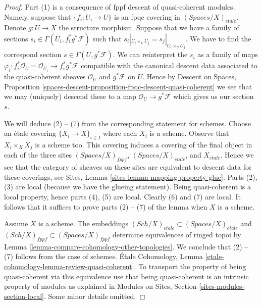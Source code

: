 \documentclass{stacks-project}
\theoremstyle{plain}
\theoremstyle{definition}
\theoremstyle{remark}
\numberwithin{equation}{subsection}
\def\Sch{\mathit{Sch}}
\def\etale{{\acute{e}tale}}
\begin{document}
\begin{proof}
Part (1) is a consequence of fppf descent of quasi-coherent modules.
Namely, suppose that $\{f_i : U_i \to U\}$ is an fpqc covering
in $(\textit{Spaces}/X)_\etale$. Denote $g : U \to X$ the structure
morphism. Suppose that
we have a family of sections $s_i \in \Gamma(U_i , f_i^*g^*\mathcal{F})$
such that $s_i|_{U_i \times_U U_j} = s_j|_{U_i \times_U U_j}$.
We have to find the correspond section $s \in \Gamma(U, g^*\mathcal{F})$.
We can reinterpret the $s_i$ as a family of maps
$\varphi_i : f_i^*\mathcal{O}_U = \mathcal{O}_{U_i} \to f_i^*g^*\mathcal{F}$
compatible with the canonical descent data associated to the
quasi-coherent sheaves $\mathcal{O}_U$ and $g^*\mathcal{F}$ on $U$.
Hence by Descent on Spaces, Proposition
\ref{spaces-descent-proposition-fpqc-descent-quasi-coherent}
we see that we may (uniquely) descend
these to a map $\mathcal{O}_U \to g^*\mathcal{F}$ which gives
us our section $s$.

\medskip\noindent
We will deduce (2) -- (7) from the corresponding statement for schemes.
Choose an \'etale covering $\{X_i \to X\}_{i \in I}$
where each $X_i$ is a scheme. Observe that $X_i \times_X X_j$
is a scheme too. This covering induces a covering of
the final object in each of the three sites
$(\textit{Spaces}/X)_{fppf}$, $(\textit{Spaces}/X)_\etale$, and $X_\etale$.
Hence we see that the category of sheaves on these sites
are equivalent to descent data for these coverings, see
Sites, Lemma \ref{sites-lemma-mapping-property-glue}.
Parts (2), (3) are local (because we have the glueing statement).
Being quasi-coherent is a local property, hence parts
(4), (5) are local. Clearly (6) and (7) are local.
It follows that it suffices to prove parts (2) -- (7)
of the lemma when $X$ is a scheme.

\medskip\noindent
Assume $X$ is a scheme. The embeddings
$(\Sch/X)_\etale \subset (\textit{Spaces}/X)_\etale$ and
$(\Sch/X)_{fppf} \subset (\textit{Spaces}/X)_{fppf}$
determine equivalences of ringed topoi by
Lemma \ref{lemma-compare-cohomology-other-topologies}.
We conclude that (2) -- (7) follows from the case of schemes.
\'Etale Cohomology, Lemma
\ref{etale-cohomology-lemma-review-quasi-coherent}.
To transport the property of being quasi-coherent via
this equivalence use that being quasi-coherent is an
intrinsic property of modules as explained in
Modules on Sites, Section \ref{sites-modules-section-local}.
Some minor details omitted.
\end{proof}
\end{document}
